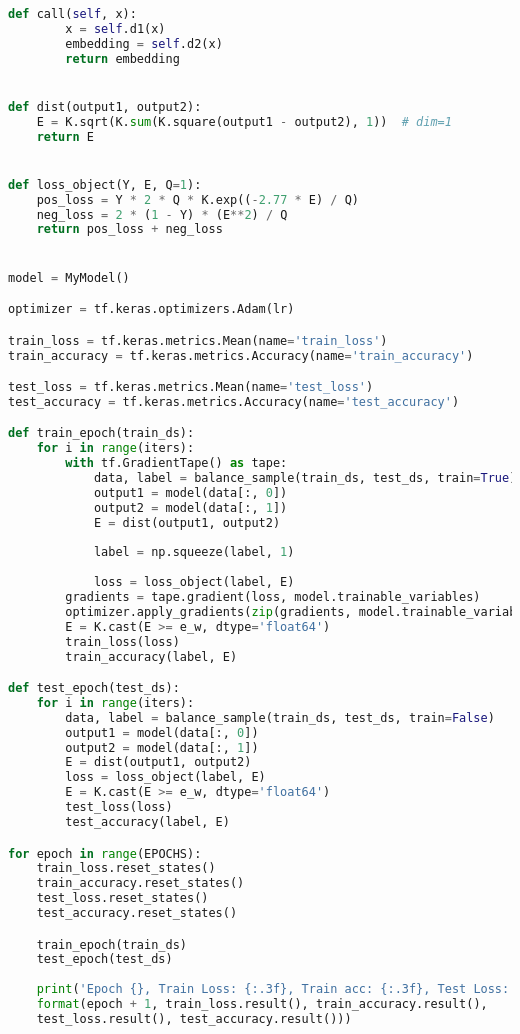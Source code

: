 \documentclass{article}
\begin{document}
\begin{lstlisting}[language=Python]
	def call(self, x):
		x = self.d1(x)
		embedding = self.d2(x)
		return embedding


def dist(output1, output2):
	E = K.sqrt(K.sum(K.square(output1 - output2), 1))  # dim=1
	return E


def loss_object(Y, E, Q=1):
	pos_loss = Y * 2 * Q * K.exp((-2.77 * E) / Q)
	neg_loss = 2 * (1 - Y) * (E**2) / Q
	return pos_loss + neg_loss


model = MyModel()

optimizer = tf.keras.optimizers.Adam(lr)

train_loss = tf.keras.metrics.Mean(name='train_loss')
train_accuracy = tf.keras.metrics.Accuracy(name='train_accuracy')

test_loss = tf.keras.metrics.Mean(name='test_loss')
test_accuracy = tf.keras.metrics.Accuracy(name='test_accuracy')

def train_epoch(train_ds):
	for i in range(iters):
		with tf.GradientTape() as tape:
			data, label = balance_sample(train_ds, test_ds, train=True)
			output1 = model(data[:, 0])
			output2 = model(data[:, 1])
			E = dist(output1, output2)
			
			label = np.squeeze(label, 1)
			
			loss = loss_object(label, E)
		gradients = tape.gradient(loss, model.trainable_variables)
		optimizer.apply_gradients(zip(gradients, model.trainable_variables))
		E = K.cast(E >= e_w, dtype='float64')
		train_loss(loss)
		train_accuracy(label, E)

def test_epoch(test_ds):
	for i in range(iters):
		data, label = balance_sample(train_ds, test_ds, train=False)
		output1 = model(data[:, 0])
		output2 = model(data[:, 1])
		E = dist(output1, output2)
		loss = loss_object(label, E)
		E = K.cast(E >= e_w, dtype='float64')
		test_loss(loss)
		test_accuracy(label, E)

for epoch in range(EPOCHS):
	train_loss.reset_states()
	train_accuracy.reset_states()
	test_loss.reset_states()
	test_accuracy.reset_states()

	train_epoch(train_ds)
	test_epoch(test_ds)
	
	print('Epoch {}, Train Loss: {:.3f}, Train acc: {:.3f}, Test Loss: {:.3f} Test acc: {:.3f}'.
    format(epoch + 1, train_loss.result(), train_accuracy.result(),
	test_loss.result(), test_accuracy.result()))

\end{lstlisting}   
        
    
\end{document}
